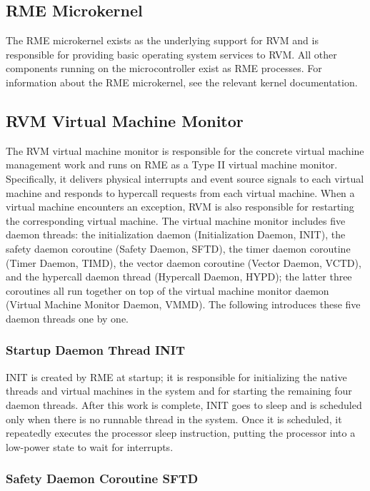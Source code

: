\subsection{RME Microkernel}\label{subsec:2-1-1}

The RME microkernel exists as the underlying support for RVM and is responsible for providing basic operating system services to RVM. All other components running on the microcontroller exist as RME processes. For information about the RME microkernel, see the relevant kernel documentation.

\subsection{RVM Virtual Machine Monitor}\label{subsec:2-1-2}

The RVM virtual machine monitor is responsible for the concrete virtual machine management work and runs on RME as a Type II virtual machine monitor. Specifically, it delivers physical interrupts and event source signals to each virtual machine and responds to hypercall requests from each virtual machine. When a virtual machine encounters an exception, RVM is also responsible for restarting the corresponding virtual machine. The virtual machine monitor includes five daemon threads: the initialization daemon (Initialization
Daemon, INIT), the safety daemon coroutine (Safety Daemon, SFTD), the timer
daemon coroutine (Timer
Daemon, TIMD), the vector daemon coroutine (Vector
Daemon, VCTD), and the hypercall daemon thread (Hypercall
Daemon, HYPD); the latter three coroutines all run together on top of the virtual machine monitor daemon (Virtual
Machine Monitor Daemon, VMMD). The following introduces these five daemon threads one by one.

\subsubsection{Startup Daemon Thread INIT}\label{subsubsec:2-1-2-1}

INIT is created by RME at startup; it is responsible for initializing the native threads and virtual machines in the system and for starting the remaining four daemon threads. After this work is complete, INIT goes to sleep and is scheduled only when there is no runnable thread in the system. Once it is scheduled, it repeatedly executes the processor sleep instruction, putting the processor into a low-power state to wait for interrupts.

\subsubsection{Safety Daemon Coroutine SFTD}\label{subsubsec:2-1-2-2}


